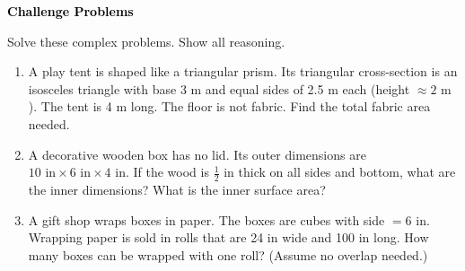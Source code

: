 \documentclass[12pt, letterpaper, fleqn]{article}
\begin{document}
\newpage

\begin{tcolorbox}[colback=black!10]
\large\textcolor{black}{\textbf{Challenge Problems}}
\end{tcolorbox}

\noindent
Solve these complex problems. Show all reasoning.

\vspace{3mm}

\begin{enumerate}[itemsep=2.4cm, leftmargin=0.6cm]

\item A play tent is shaped like a triangular prism. Its triangular cross-section is an isosceles triangle with base 3 m and equal sides of 2.5 m each (height $\approx 2\text{ m}$). The tent is 4 m long. The floor is not fabric. Find the total fabric area needed.

\vspace{2.3cm}

\item A decorative wooden box has no lid. Its outer dimensions are $10\text{ in} \times 6\text{ in} \times 4\text{ in}$. If the wood is $\frac{1}{2}$ in thick on all sides and bottom, what are the inner dimensions? What is the inner surface area?

\vspace{2.3cm}

\item A gift shop wraps boxes in paper. The boxes are cubes with side $= 6\text{ in}$. Wrapping paper is sold in rolls that are 24 in wide and 100 in long. How many boxes can be wrapped with one roll? (Assume no overlap needed.)

\vspace{2.5cm}

\end{enumerate}
\end{document}
